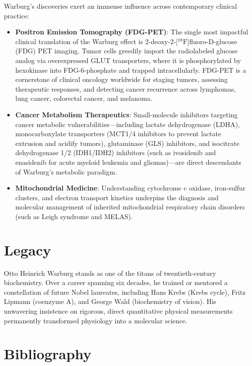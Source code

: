 Warburg's discoveries exert an immense influence across contemporary clinical practice:
\begin{itemize}
    \item \textbf{Positron Emission Tomography (FDG-PET)}: The single most impactful clinical translation of the Warburg effect is 2-deoxy-2-[$^{18}\text{F}$]fluoro-D-glucose (FDG) PET imaging. Tumor cells greedily import the radiolabeled glucose analog via overexpressed GLUT transporters, where it is phosphorylated by hexokinase into FDG-6-phosphate and trapped intracellularly. FDG-PET is a cornerstone of clinical oncology worldwide for staging tumors, assessing therapeutic responses, and detecting cancer recurrence across lymphomas, lung cancer, colorectal cancer, and melanoma.
    \item \textbf{Cancer Metabolism Therapeutics}: Small-molecule inhibitors targeting cancer metabolic vulnerabilities—including lactate dehydrogenase (LDHA), monocarboxylate transporters (MCT1/4 inhibitors to prevent lactate extrusion and acidify tumors), glutaminase (GLS) inhibitors, and isocitrate dehydrogenase 1/2 (IDH1/IDH2) inhibitors (such as ivosidenib and enasidenib for acute myeloid leukemia and gliomas)—are direct descendants of Warburg's metabolic paradigm.
    \item \textbf{Mitochondrial Medicine}: Understanding cytochrome c oxidase, iron-sulfur clusters, and electron transport kinetics underpins the diagnosis and molecular management of inherited mitochondrial respiratory chain disorders (such as Leigh syndrome and MELAS).
\end{itemize}

\section{Legacy}

Otto Heinrich Warburg stands as one of the titans of twentieth-century biochemistry. Over a career spanning six decades, he trained or mentored a constellation of future Nobel laureates, including Hans Krebs (Krebs cycle), Fritz Lipmann (coenzyme A), and George Wald (biochemistry of vision). His unwavering insistence on rigorous, direct quantitative physical measurements permanently transformed physiology into a molecular science.

\section{Bibliography}

